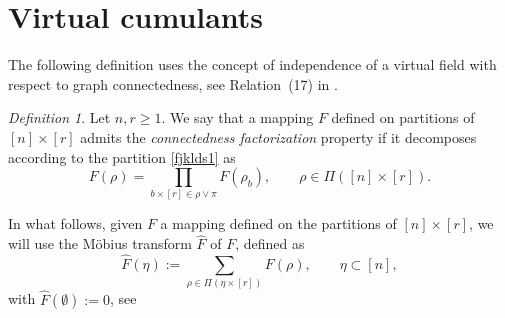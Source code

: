 \documentclass[bj,authoryear,noshowframe]{imsart}
\theoremstyle{plain}
\theoremstyle{remark}
\newtheorem{definition}[theorem]{Definition}
\newcommand{\R}{\mathbb{R}}
\begin{document}
\section{Virtual cumulants} 
\label{s3}
\noindent
The following definition
uses the concept of independence of a virtual field
with respect to graph connectedness,
see Relation~(17) in \cite[p.~34]{MalyshevMinlos91}. 
\begin{definition}
  Let $n,r\geq 1$.
  We say that a mapping $F$ defined on partitions of
  $[n]\times [r]$
  admits the {\it connectedness factorization} property
  if it decomposes according to the partition \eqref{fjklds1} as 
  \begin{equation}
    \label{dia-factoriz}
  F ( \rho ) = \prod_{b \times [r] \in \rho \vee \pi } F ( \rho_b ),  
  \qquad
   \rho \in \Pi ([n]\times [r]). 
\end{equation}
\end{definition} 
In what follows,
given $F$ a mapping defined on the partitions of
  $[n]\times [r]$, 
  we will use the M\"obius transform
  $\widehat{F}$ of $F$, 
  defined as
\begin{equation}
\nonumber %
  \widehat{F}( \eta ):=\sum_{\rho \in \Pi ( \eta \times [r])} F(\rho ),
  \qquad
  \eta \subset [n],
\end{equation}
with $\widehat{F}(\emptyset):=0$,
see \cite{rota1964} %
\end{document}
